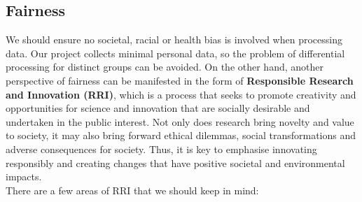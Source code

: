 \subsection{Fairness}
We should ensure no societal, racial or health bias is involved when processing data. Our project collects minimal personal data, so the problem of differential processing for distinct groups can be avoided. 
On the other hand, another perspective of fairness can be manifested in the form of \textbf{Responsible Research and Innovation (RRI)}, which is a process that seeks to promote creativity and opportunities 
for science and innovation that are socially desirable and undertaken in the public interest. Not only does research bring novelty 
and value to society, it may also bring forward ethical dilemmas, social transformations and adverse consequences for society. Thus, it is key to emphasise innovating responsibly and creating changes that
have positive societal and environmental impacts.\\ There are a few areas of RRI that we should keep in mind:
